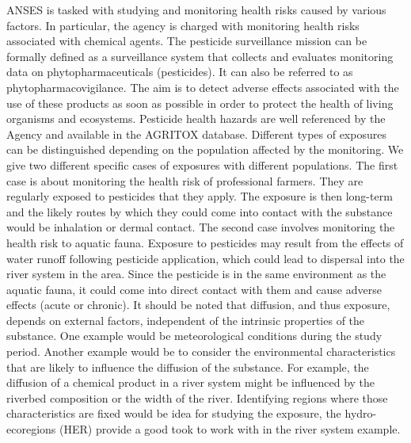 ANSES is tasked with studying and monitoring health risks caused by various factors. In particular, the agency is charged with monitoring health risks associated with chemical agents. The pesticide surveillance mission can be formally defined as a surveillance system that collects and evaluates monitoring data on phytopharmaceuticals (pesticides). It can also be referred to as phytopharmacovigilance. The aim is to detect adverse effects associated with the use of these products as soon as possible in order to protect the health of living organisms and ecosystems. Pesticide health hazards are well referenced by the Agency and available in the AGRITOX database. Different types of exposures can be distinguished depending on the population affected by the monitoring. We give two different specific cases of exposures with different populations. The first case is about monitoring the health risk of professional farmers. They are regularly exposed to pesticides that they apply. The exposure is then long-term and the likely routes by which they could come into contact with the substance would be inhalation or dermal contact. The second case involves monitoring the health risk to aquatic fauna. Exposure to pesticides may result from the effects of water runoff following pesticide application, which could lead to dispersal into the river system in the area. Since the pesticide is in the same environment as the aquatic fauna, it could come into direct contact with them and cause adverse effects (acute or chronic). It should be noted that diffusion, and thus exposure, depends on external factors, independent of the intrinsic properties of the substance. One example would be meteorological conditions during the study period. Another example would be to consider the environmental characteristics that are likely to influence the diffusion of the substance. For example, the diffusion of a chemical product in a river system might be influenced by the riverbed composition or the width of the river. Identifying regions where those characteristics are fixed would be idea for studying the exposure, the hydro-ecoregions (HER) provide a good took to work with in the river system example.           

